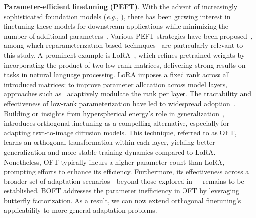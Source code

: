 \textbf{Parameter-efficient finetuning (PEFT)}. With the advent of increasingly sophisticated foundation models (\emph{e.g.}, \cite{brown2020language,radford2021learning,rombach2022high,kirillov2023segment}), there has been growing interest in finetuning these models for downstream applications while minimizing the number of additional parameters~\cite{treviso2023efficient,ding2023parameter,lialin2023scaling}. Various PEFT strategies have been proposed~\cite{houlsby2019parameter,aghajanyan2020intrinsic,hulora2022,edalati2022krona,wang2022adamix,gheini2021cross,zaken2022bitfit,guo2020parameter,sung2021training,ansell2022composable,lester2021power,li2021prefix,vu2022spot,he2021towards,mao2021unipelt,karimi2021compacter,liu2022few,sung2022lst,chen2022parameter,jia2022visual,chen2022adaptformer,zhang2022neural,jie2023fact,lian2022scaling,luo2023towards}, among which reparameterization-based techniques~\cite{aghajanyan2020intrinsic,hulora2022,edalati2022krona} are particularly relevant to this study. A prominent example is LoRA~\cite{hulora2022}, which refines pretrained weights by incorporating the product of two low-rank matrices, delivering strong results on tasks in natural language processing. LoRA imposes a fixed rank across all introduced matrices; to improve parameter allocation across model layers, approaches such as~\cite{zhang2022adaptive,valipour2022dylora,zhang2023increlora} adaptively modulate the rank per layer. The tractability and effectiveness of low-rank parameterization have led to widespread adoption~\cite{dettmers2023qlora,zi2023delta,chavan2023one}. Building on insights from hyperspherical energy's role in generalization~\cite{liu2018learning,liu2021orthogonal}, \cite{qiu2023controlling} introduces orthogonal finetuning as a compelling alternative, especially for adapting text-to-image diffusion models. This technique, referred to as OFT, learns an orthogonal transformation within each layer, yielding better generalization and more stable training dynamics compared to LoRA. Nonetheless, OFT typically incurs a higher parameter count than LoRA, prompting efforts to enhance its efficiency. Furthermore, its effectiveness across a broader set of adaptation scenarios—beyond those explored in~\cite{qiu2023controlling}—remains to be established. BOFT addresses the parameter inefficiency in OFT by leveraging butterfly factorization. As a result, we can now extend orthogonal finetuning's applicability to more general adaptation problems.

